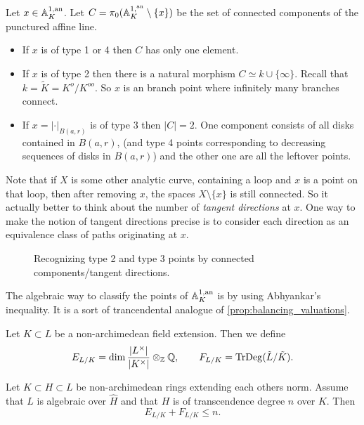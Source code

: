 \begin{proposition}
	Let $x \in \mathbb{A}_K^{1,\text{an}}$. 
	Let $C = \pi_0(\mathbb{A}_K^{1, {}^{\text{an}}}\setminus \{ x\} )$ be the set of connected components of the punctured affine line. 
	\begin{itemize}
		\item If $x$ is of type 1  or 4 then $C$ has only one element.
		\item If $x$ is of type 2 then there is a natural morphism $C \simeq k \cup \{\infty\} $. Recall that $k = \tilde K = K^{o} / K^{oo} $. 
			So $x$ is an branch point where infinitely many branches connect. 
		\item If $x = |\cdot |_{B(a, r)}$ is of type 3 then $|C| = 2$. One component consists of all disks contained in $B(a, r)$, (and type 4 points corresponding to decreasing sequences of disks in $B(a,r)$) and the other one are all the leftover points. 
	\end{itemize}
\end{proposition}
\begin{remark}
	Note that if  $X$ is some other analytic curve, containing a loop and $x$ is a point on that loop, then after removing $x$, the spaces $X \setminus \{x\} $ is still connected. 
	So it actually better to think about the number of \emph{tangent directions} at $x$. 
	One way to make the notion of tangent directions precise is to consider each direction as an equivalence class of paths originating at $x$.
\end{remark}
\begin{figure}[ht]
    \centering
    \caption{Recognizing type 2 and type 3 points by connected components/tangent directions.}
    \label{fig:type2_type3}
\end{figure}


The algebraic way to classify the points of $\mathbb{A}_K^{1,\text{an}}$ is by using Abhyankar's inequality. 
It is a sort of trancendental analogue of \cref{prop:balancing_valuations}.
\begin{definition}
	Let $K \subset L$ be a non-archimedean field extension. 
	Then we define \[
		E_{ L / K} = \dim \frac{|L^{\times }|}{|K^{\times }|} \otimes_{\mathbb{Z}} \mathbb{Q}, \qquad F_{L / K} = \operatorname{TrDeg}(\tilde L / \tilde K)
	.\] 
\end{definition}

\begin{theorem}
	Let $K \subset H \subset L$ be non-archimedean rings extending each others norm. Assume that $L$ is algebraic over $\hat{H}$ and that $H$ is of transcendence degree $n$ over $K$. Then \[
	E_{L / K} + F_{L / K}  \le n
	.\] 
\end{theorem}

